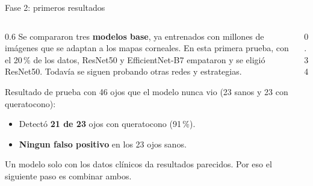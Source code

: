 \begin{frame}{Fase 2: primeros resultados}
    \begin{columns}[c, totalwidth=0.96\textwidth]
        \begin{column}{0.6\textwidth}
            \small
            Se compararon tres \textbf{modelos base}, ya entrenados con millones de imágenes que se adaptan a los mapas corneales. En esta primera prueba, con el 20\,\% de los datos, ResNet50 y EfficientNet-B7 empataron y se eligió ResNet50. Todavía se siguen probando otras redes y estrategias.
            \vspace{0.2cm}

            Resultado de prueba con 46 ojos que el modelo nunca vio (23 sanos y 23 con queratocono):
            \begin{itemize}
                \item Detectó \textbf{21 de 23} ojos con queratocono (91\,\%).
                \item \textbf{Ningun falso positivo} en los 23 ojos sanos.
            \end{itemize}
            \vspace{0.1cm}
            Un modelo solo con los datos clínicos da resultados parecidos. Por eso el siguiente paso es combinar ambos.
        \end{column}
        \hspace{0.03\textwidth}
        \begin{column}{0.34\textwidth}
            \centering
        \end{column}
    \end{columns}
\end{frame}

